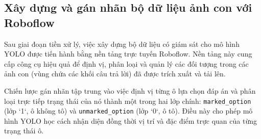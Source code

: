 \subsection{Xây dựng và gán nhãn bộ dữ liệu ảnh con với Roboflow}
\label{subsec:data_labeling_academic_condensed_2imgs_v6}

Sau giai đoạn tiền xử lý, việc xây dựng bộ dữ liệu có giám sát cho mô hình YOLO được tiến hành bằng nền tảng trực tuyến Roboflow. Nền tảng này cung cấp công cụ hiệu quả để định vị, phân loại và quản lý các đối tượng trong các ảnh con (vùng chứa các khối câu trả lời) đã được trích xuất và tải lên.

Chiến lược gán nhãn tập trung vào việc định vị từng ô lựa chọn đáp án và phân loại trực tiếp trạng thái của nó thành một trong hai lớp chính: \texttt{marked\_option} (lớp `1`, ô không tô) và \texttt{unmarked\_option} (lớp `0`, ô tô). Điều này cho phép mô hình YOLO học cách nhận diện đồng thời vị trí và đặc điểm trực quan của từng trạng thái ô.

